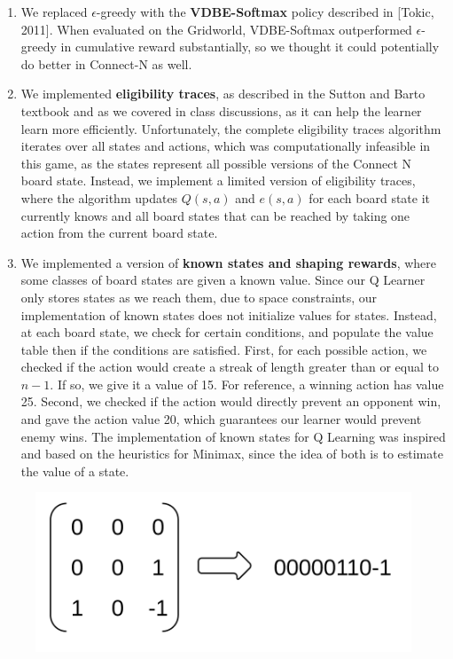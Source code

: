 \documentclass[12pt]{article}
\begin{document}
\begin{enumerate}
\item We replaced $\epsilon$-greedy with the \textbf{VDBE-Softmax} policy described in [Tokic, 2011]. When evaluated on the Gridworld, VDBE-Softmax outperformed $\epsilon$-greedy in cumulative reward substantially, so we thought it could potentially do better in Connect-N as well.
\item We implemented \textbf{eligibility traces}, as described in the Sutton and Barto textbook and as we covered in class discussions, as it can help the learner learn more efficiently. Unfortunately, the complete eligibility traces algorithm iterates over all states and actions, which was computationally infeasible in this game, as the states represent all possible versions of the Connect N board state. Instead, we implement a limited version of eligibility traces, where the algorithm updates $Q(s, a)$ and $e(s, a)$ for each board state it currently knows and all board states that can be reached by taking one action from the current board state.
\item We implemented a version of \textbf{known states and shaping rewards}, where some classes of board states are given a known value. Since our Q Learner only stores states as we reach them, due to space constraints, our implementation of known states does not initialize values for states. Instead, at each board state, we check for certain conditions, and populate the value table then if the conditions are satisfied. First, for each possible action, we checked if the action would create a streak of length greater than or equal to $n-1$. If so, we give it a value of 15. For reference, a winning action has value 25. Second, we checked if the action would directly prevent an opponent win, and gave the action value 20, which guarantees our learner would prevent enemy wins. The implementation of known states for Q Learning was inspired and based on the heuristics for Minimax, since the idea of both is to estimate the value of a state.
\end{enumerate}

\begin{figure}
	\includegraphics[scale=.16]{transform}
\end{figure}
\end{document}
